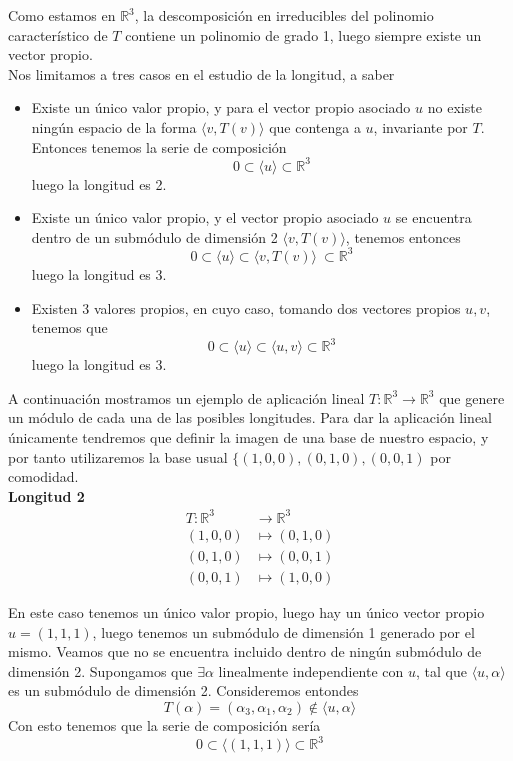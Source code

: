 Como estamos en \(\mathbb{R}^3\), la descomposición en irreducibles del
polinomio característico de \(T\) contiene un polinomio de grado 1, luego
siempre existe un vector propio.\\

Nos limitamos a tres casos en el estudio de la longitud, a saber
\begin{itemize}
\item Existe un único valor propio, y para el vector propio asociado \(u\)  no existe ningún espacio de la forma
  \(\langle v, T(v)\rangle \) que contenga a \(u\), invariante por \(T\). Entonces tenemos la serie de composición
  \[
    0 \subset \langle u \rangle \subset \mathbb{R}^3
  \]
  luego la longitud es 2.
\item Existe un único valor propio, y el vector propio asociado \(u\) se encuentra dentro de un submódulo de
  dimensión 2 \(\langle v, T(v) \rangle\), tenemos entonces
  \[
    0 \subset \langle u \rangle \subset \langle v, T(v) \rangle\ \subset \mathbb{R}^3
  \]
  luego la longitud es 3.
\item Existen 3 valores propios, en cuyo caso, tomando dos vectores propios \(u,v\), tenemos que
\[
0 \subset \langle u \rangle \subset \langle u, v \rangle \subset \mathbb{R}^3
\]
luego la longitud es 3.
\end{itemize}

A continuación mostramos un ejemplo de aplicación lineal \(T:\mathbb{R}^3 \rightarrow \mathbb{R}^3\) que genere un módulo de cada una de las posibles longitudes.
Para dar la aplicación lineal únicamente tendremos que definir la imagen de una base de nuestro espacio, y por tanto utilizaremos la base usual
\(\{(1,0,0), (0,1,0), (0,0,1)\) por comodidad.\\

\textbf{Longitud 2}%
\[
\begin{aligned}
  T:\mathbb{R}^3 &\rightarrow \mathbb{R}^3\\
  (1,0,0) &\mapsto (0,1,0)\\
  (0,1,0) &\mapsto (0,0,1)\\
  (0,0,1) &\mapsto (1,0,0)
\end{aligned}
\]


En este caso tenemos un único valor propio, luego hay un único vector propio \(u = (1,1,1)\), luego tenemos un
submódulo de dimensión 1 generado por el mismo. Veamos que no se encuentra
incluido dentro de ningún submódulo de dimensión 2.
Supongamos que \(\exists \alpha\) linealmente independiente con \(u\), tal que
\(\langle u, \alpha \rangle\) es un submódulo de dimensión 2. Consideremos
entondes
\[
  T(\alpha) = (\alpha_3, \alpha_1, \alpha_2) \not \in \langle u , \alpha \rangle
\]
Con esto tenemos que la serie de composición sería
\[
        0 \subset \langle (1,1,1) \rangle \subset \mathbb{R}^3
\]

